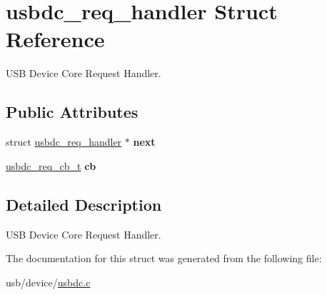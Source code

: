 \hypertarget{structusbdc__req__handler}{}\section{usbdc\+\_\+req\+\_\+handler Struct Reference}
\label{structusbdc__req__handler}


U\+SB Device Core Request Handler.  


\subsection*{Public Attributes}
\begin{DoxyCompactItemize}
\item 
\mbox{\label{structusbdc__req__handler_ab7fa5b1d38bff7662d78260ec3804fb4}} 
struct \hyperlink{structusbdc__req__handler}{usbdc\+\_\+req\+\_\+handler} $\ast$ {\bfseries next}
\item 
\mbox{\label{structusbdc__req__handler_aeae67222c95e3abf39425015f51b1d19}} 
\hyperlink{usbdc_8h_a9705b1ccc165d1205e950168d972670c}{usbdc\+\_\+req\+\_\+cb\+\_\+t} {\bfseries cb}
\end{DoxyCompactItemize}


\subsection{Detailed Description}
U\+SB Device Core Request Handler. 

The documentation for this struct was generated from the following file\+:\begin{DoxyCompactItemize}
\item 
usb/device/\hyperlink{usbdc_8c}{usbdc.\+c}\end{DoxyCompactItemize}
